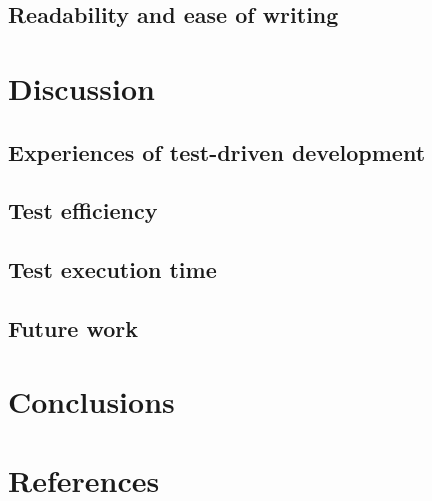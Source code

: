 \documentclass[a4paper]{report}
\begin{document}
  \section{Readability and ease of writing}
  


\chapter{Discussion}
\label{chap:discussion}

  

  \section{Experiences of test-driven development}

  \section{Test efficiency}
  

  \section{Test execution time}
  

  \section{Future work}
  


\chapter{Conclusions}
\label{chap:conclusions}

    


\newpage

\chapter*{References}
\begin{multicols}{2}
    \small
    \renewcommand{\bibsection}{ \vspace{-\baselineskip}\vspace{-1.1mm} }
    
    
\end{multicols}
\end{document}

